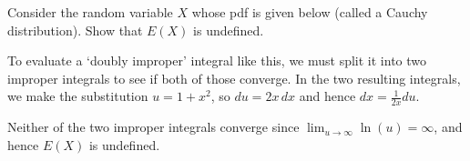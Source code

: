 \begin{examp}Consider the random variable $X$ whose pdf is given below (called a Cauchy distribution). Show that $E(X)$ is undefined.
\vspace{-0.75em}
\begin{center}
    \begin{minipage}{.5\textwidth}
        \centering
{}
\vspace{1.25em}
    \end{minipage}%
    \begin{minipage}{0.5\textwidth}
        \centering
\end{minipage}
\end{center}
\par
\noindent To evaluate a `doubly improper' integral like this, we must split it into two improper integrals to see if both of those converge. In the two resulting integrals, we make the substitution $u = 1+x^2$, so $du = 2x \, dx$ and hence $dx = \frac{1}{2x}du$.
\par
\noindent Neither of the two improper integrals converge since $\lim_{u \to \infty} \ln(u) = \infty$, and hence $E(X)$ is undefined.
\end{examp}

